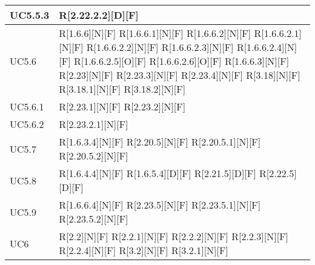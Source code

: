 \begin{longtable}{X | X}
\hline
UC5.5.3 & R[2.22.2.2][D][F]  \\
\hline
UC5.6 & R[1.6.6][N][F] \newline
R[1.6.6.1][N][F] \newline
R[1.6.6.2][N][F] \newline
R[1.6.6.2.1][N][F] \newline
R[1.6.6.2.2][N][F] \newline
R[1.6.6.2.3][N][F] \newline
R[1.6.6.2.4][N][F] \newline
R[1.6.6.2.5][O][F] \newline
R[1.6.6.2.6][O][F] \newline
R[1.6.6.3][N][F] \newline
R[2.23][N][F] \newline
R[2.23.3][N][F] \newline
R[2.23.4][N][F] \newline
R[3.18][N][F] \newline
R[3.18.1][N][F] \newline
R[3.18.2][N][F]  \\
\hline
UC5.6.1 & R[2.23.1][N][F] \newline
R[2.23.2][N][F]  \\
\hline
UC5.6.2 & R[2.23.2.1][N][F]  \\
\hline
UC5.7 & R[1.6.3.4][N][F] \newline
R[2.20.5][N][F] \newline
R[2.20.5.1][N][F] \newline
R[2.20.5.2][N][F]  \\
\hline
UC5.8 & R[1.6.4.4][N][F] \newline
R[1.6.5.4][D][F] \newline
R[2.21.5][D][F] \newline
R[2.22.5][D][F]  \\
\hline
UC5.9 & R[1.6.6.4][N][F] \newline
R[2.23.5][N][F] \newline
R[2.23.5.1][N][F] \newline
R[2.23.5.2][N][F]  \\
\hline
UC6 & R[2.2][N][F] \newline
R[2.2.1][N][F] \newline
R[2.2.2][N][F] \newline
R[2.2.3][N][F] \newline
R[2.2.4][N][F] \newline
R[3.2][N][F] \newline
R[3.2.1][N][F] \newline

\end{longtable}
